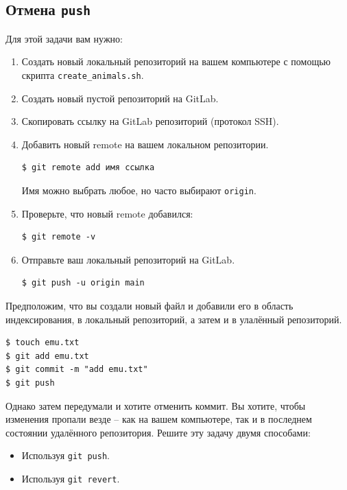 \documentclass{article}
\begin{document}
\subsection{Отмена \texttt{push}}
Для этой задачи вам нужно:
\begin{enumerate}
\item Создать новый локальный репозиторий на вашем компьютере с помощью скрипта \texttt{create\_animals.sh}.
\item Создать новый пустой репозиторий на GitLab.
\item Скопировать ссылку на GitLab репозиторий (протокол SSH).
\item Добавить новый remote на вашем локальном репозитории. 
\begin{lstlisting}[style=csMiptBash]
$ git remote add имя ссылка
\end{lstlisting}
Имя можно выбрать любое, но часто выбирают \texttt{origin}.
\item Проверьте, что новый remote добавился:
\begin{lstlisting}[style=csMiptBash]
$ git remote -v
\end{lstlisting}
\item Отправьте ваш локальный репозиторий на GitLab.
\begin{lstlisting}[style=csMiptBash]
$ git push -u origin main
\end{lstlisting}
\end{enumerate}

\noindent Предположим, что вы создали новый файл и добавили его в область индексирования, в локальный репозиторий, а затем и в улалённый репозиторий.
\begin{lstlisting}[style=csMiptBash]
$ touch emu.txt
$ git add emu.txt
$ git commit -m "add emu.txt"
$ git push
\end{lstlisting}
Однако затем передумали и хотите отменить коммит. Вы хотите, чтобы изменения пропали везде -- как на вашем компьютере, так и в последнем состоянии удалённого репозитория. Решите эту задачу двумя способами:
\begin{itemize}
\item Используя \texttt{git push}.
\item Используя \texttt{git revert}.
\end{itemize}
\end{document}
